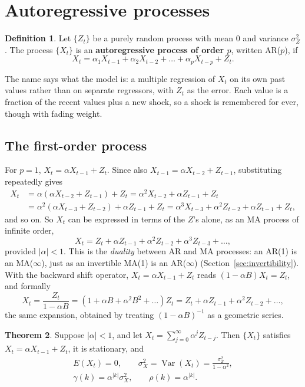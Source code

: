\documentclass[11pt,a4paper]{article}
\theoremstyle{definition}
\newtheorem{thm}{Theorem}[subsection]
\newtheorem{defn}[thm]{Definition}
\DeclareMathOperator{\Var}{Var}
\begin{document}
\pagebreak

\section{Autoregressive processes}\label{sec:ar}
\begin{defn}
Let $\{Z_t\}$ be a purely random process with mean $0$ and variance $\sigma_Z^2$. The process $\{X_t\}$ is an \textbf{autoregressive
process of order $p$}, written AR($p$), if
\[
X_t = \alpha_1X_{t-1} + \alpha_2X_{t-2} + \dots + \alpha_pX_{t-p} + Z_t .
\]
\end{defn}
The name says what the model is: a multiple regression of $X_t$ on its own past values rather than on
separate regressors, with $Z_t$ as the error. Each value is a fraction of the recent values plus a new shock, so
a shock is remembered for ever, though with fading weight.

\subsection{The first-order process}
For $p = 1$, $X_t = \alpha X_{t-1} + Z_t$. Since also $X_{t-1} = \alpha X_{t-2} + Z_{t-1}$, substituting repeatedly gives
\begin{align*}
X_t &= \alpha(\alpha X_{t-2} + Z_{t-1}) + Z_t = \alpha^2X_{t-2} + \alpha Z_{t-1} + Z_t \\
&= \alpha^2(\alpha X_{t-3} + Z_{t-2}) + \alpha Z_{t-1} + Z_t = \alpha^3X_{t-3} + \alpha^2Z_{t-2} + \alpha Z_{t-1} + Z_t ,
\end{align*}
and so on. So $X_t$ can be expressed in terms of the $Z$'s alone, as an MA process of infinite order,
\[
X_t = Z_t + \alpha Z_{t-1} + \alpha^2Z_{t-2} + \alpha^3Z_{t-3} + \dots ,
\]
provided $|\alpha| < 1$. This is the \emph{duality} between AR and MA processes: an AR(1) is an MA($\infty$), just as an
invertible MA(1) is an AR($\infty$) (Section~\ref{sec:invertibility}). With the backward shift operator, $X_t = \alpha X_{t-1} + Z_t$ reads
$(1 - \alpha B)X_t = Z_t$, and formally
\[
X_t = \frac{Z_t}{1 - \alpha B} = (1 + \alpha B + \alpha^2B^2 + \dots)Z_t = Z_t + \alpha Z_{t-1} + \alpha^2Z_{t-2} + \dots ,
\]
the same expansion, obtained by treating $(1 - \alpha B)^{-1}$ as a geometric series.

\begin{thm}\label{thm:ar1}
Suppose $|\alpha| < 1$, and let $X_t = \sum_{j=0}^\infty\alpha^jZ_{t-j}$. Then $\{X_t\}$ satisfies $X_t = \alpha X_{t-1} + Z_t$, it is stationary, and
\begin{gather*}
E(X_t) = 0 , \qquad \sigma_X^2 = \Var(X_t) = \frac{\sigma_Z^2}{1 - \alpha^2} , \\
\gamma(k) = \alpha^{|k|}\sigma_X^2 , \qquad \rho(k) = \alpha^{|k|} .
\end{gather*}
\end{thm}
\end{document}
